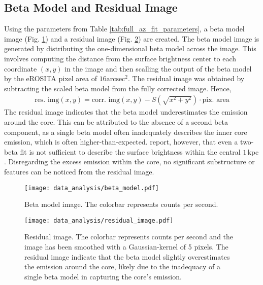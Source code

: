 \subsection{Beta Model and Residual Image}
Using the parameters from Table \ref{tab:full_az_fit_parameters}, a beta model image (Fig. \ref{fig:beta_model}) and a residual image (Fig. \ref{fig:residual_image}) are created. The beta model image is generated by distributing the one-dimensional beta model across the image. This involves computing the distance from the surface brightness center to each coordinate \((x, y)\) in the image and then scalling the output of the beta model by the eROSITA pixel area of \(16\text{arcsec}^2\). The residual image was obtained by subtracting the scaled beta model from the fully corrected image. Hence,
\begin{align*}
    \text{res. img}(x, y) = \text{corr. img}(x, y) - S\left(\sqrt{x^2 + y^2}\right) \cdot \text{pix. area}
\end{align*}
The residual image indicates that the beta model underestimates the emission around the core. This can be attributed to the absence of a second beta component, as a single beta model often inadequately describes the inner core emission, which is often higher-than-expected. \cite{Sun_2003} report, however, that even a two-beta fit is not sufficient to describe the surface brightness within the central \(1\,\text{kpc}\). Disregarding the excess emission within the core, no significant substructure or features can be noticed from the residual image.
\begin{figure}[htbp]
    \centering
    \texttt{[image: data\_analysis/beta\_model.pdf]}
    \caption{Beta model image. The colorbar represents counts per second.}
    \label{fig:beta_model}
\end{figure}
\begin{figure}[htbp]
    \centering
    \texttt{[image: data\_analysis/residual\_image.pdf]}
    \caption{Residual image. The colorbar represents counts per second and the image has been smoothed with a Gaussian-kernel of 5 pixels. The residual image indicate that the beta model slightly overestimates the emission around the core, likely due to the inadequacy of a single beta model in capturing the core's emission.}
    \label{fig:residual_image}
\end{figure}
